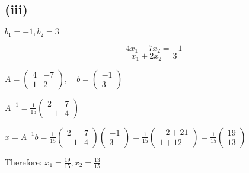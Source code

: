 \subsection*{(iii)} $b_1 = -1, b_2 = 3$

\[
	4x_1 - 7x_2 = -1
\]
\[
	x_1 + 2x_2 = 3
\]

$A = \begin{pmatrix}
	4 & -7 \\
	1 & 2
\end{pmatrix}, \quad b = \begin{pmatrix}
	-1 \\
	3
\end{pmatrix}$

$A^{-1} = \frac{1}{15}\begin{pmatrix}
	2 & 7 \\
	-1 & 4
\end{pmatrix}$

$x = A^{-1}b = \frac{1}{15}\begin{pmatrix}
	2 & 7 \\
	-1 & 4
\end{pmatrix}\begin{pmatrix}
	-1 \\
	3
\end{pmatrix} = \frac{1}{15}\begin{pmatrix}
	-2 + 21 \\
	1 + 12
\end{pmatrix} = \frac{1}{15}\begin{pmatrix}
	19 \\
	13
\end{pmatrix}$

Therefore: $x_1 = \frac{19}{15}, x_2 = \frac{13}{15}$